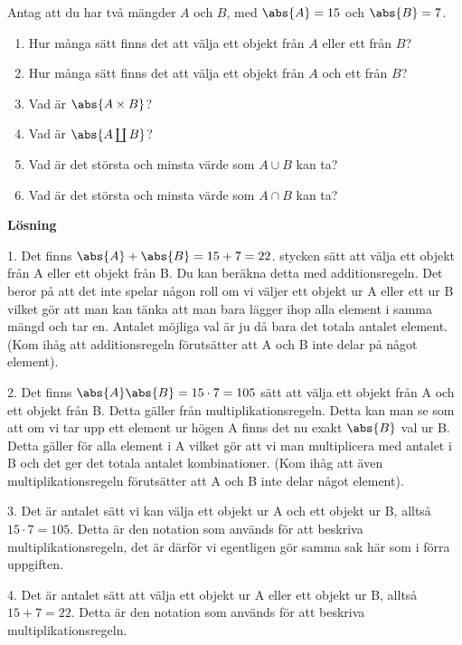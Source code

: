 \documentclass{tufte-handout}
\begin{document}
\begin{xca}
	Antag att du har två mängder $A$ och $B$, med $\abs{A} = 15$ och $\abs{B} = 7$.
	\begin{enumerate}
		\item Hur många sätt finns det att välja ett objekt från $A$ eller ett från $B$?
		\item Hur många sätt finns det att välja ett objekt från $A$ och ett från $B$?
		\item Vad är $\abs{A\times B}$?
		\item Vad är $\abs{A \coprod B}$?
		\item Vad är det största och minsta värde som $A \cup B$ kan ta?
		\item Vad är det största och minsta värde som $A \cap B$ kan ta?
	\end{enumerate}

 \noindent\textbf{Lösning}
 
 1. Det finns $\abs{A} + \abs{B} = 15 + 7 = 22$. stycken sätt att välja ett objekt från A eller ett objekt från B. Du kan beräkna detta med additionsregeln. Det beror på att det inte spelar någon roll om vi väljer ett objekt ur A eller ett ur B vilket gör att man kan tänka att man bara lägger ihop alla element i samma mängd och tar en. Antalet möjliga val är ju då bara det totala antalet element. (Kom ihåg att additionsregeln förutsätter att A och B inte delar på något element).

 2. Det finns $\abs{A}\abs{B}  = 15 \cdot 7= 105$ sätt att välja ett objekt från A och ett objekt från B. Detta gäller från multiplikationsregeln. Detta kan man se som att om vi tar upp ett element ur högen A finns det nu exakt $\abs{B}$ val ur B. Detta gäller för alla element i A vilket gör att vi man multiplicera med antalet i B och det ger det totala antalet kombinationer. (Kom ihåg att även multiplikationsregeln förutsätter att A och B inte delar något element).

 3. Det är antalet sätt vi kan välja ett objekt ur A och ett objekt ur B, alltså $15 \cdot 7=105$. Detta är den notation som används för att beskriva multiplikationsregeln, det är därför vi egentligen gör samma sak här som i förra uppgiften.

 4. Det är antalet sätt att välja ett objekt ur A eller ett objekt ur B, alltså $15 + 7 = 22$. Detta är den notation som används för att beskriva multiplikationsregeln.


\end{xca}
\end{document}
